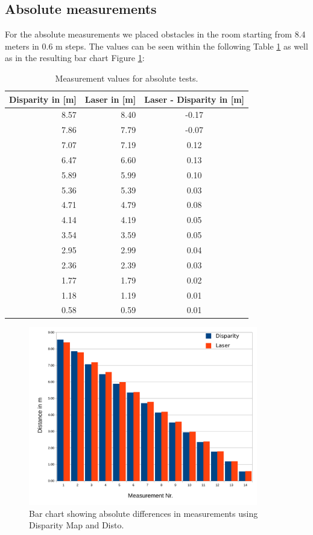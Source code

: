 \documentclass[11pt]{article}
\begin{document}
\pagebreak

\subsection{Absolute measurements}
For the absolute measurements we placed obstacles in the room starting from 8.4 meters in 0.6 m steps. The values can be seen within the following Table \ref{table:absolute-table} as well as in the resulting bar chart Figure \ref{fig:absolute-chart}:

\begin{table}[htbp]
	\begin{center}
	\begin{tabular}{|r|r|c|}
	\hline
	\multicolumn{1}{|l|}{Disparity in [m]} & \multicolumn{1}{l|}{Laser in [m]} & \multicolumn{1}{l|}{Laser - Disparity in [m]} \\ \hline
	8.57 & 8.40 & -0.17 \\ \hline
	7.86 & 7.79 & -0.07 \\ \hline
	7.07 & 7.19 & 0.12 \\ \hline
	6.47 & 6.60 & 0.13 \\ \hline
	5.89 & 5.99 & 0.10 \\ \hline
	5.36 & 5.39 & 0.03 \\ \hline
	4.71 & 4.79 & 0.08 \\ \hline
	4.14 & 4.19 & 0.05 \\ \hline
	3.54 & 3.59 & 0.05 \\ \hline
	2.95 & 2.99 & 0.04 \\ \hline
	2.36 & 2.39 & 0.03 \\ \hline
	1.77 & 1.79 & 0.02 \\ \hline
	1.18 & 1.19 & 0.01 \\ \hline
	0.58 & 0.59 & 0.01 \\ \hline
	\end{tabular}
	\end{center}
	\caption{Measurement values for absolute tests.}
	\label{table:absolute-table}
\end{table}

\begin{figure}[H]
        \centering
        \includegraphics[width=10cm]{images/absolute-measurements.pdf}
       	\caption{Bar chart showing absolute differences in measurements using Disparity Map and Disto.}
        \label{fig:absolute-chart}
\end{figure}
\end{document}
